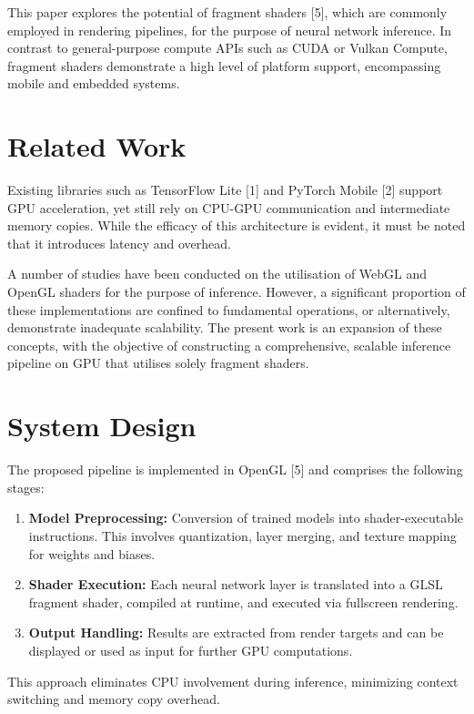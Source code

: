 \documentclass[conference]{IEEEtran}
\begin{document}
This paper explores the potential of fragment shaders [5], which are commonly employed in rendering pipelines, for the purpose of neural network inference. In contrast to general-purpose compute APIs such as CUDA or Vulkan Compute, fragment shaders demonstrate a high level of platform support, encompassing mobile and embedded systems.

\section{Related Work}
Existing libraries such as TensorFlow Lite [1] and PyTorch Mobile [2] support GPU acceleration, yet still rely on CPU-GPU communication and intermediate memory copies. While the efficacy of this architecture is evident, it must be noted that it introduces latency and overhead.

A number of studies have been conducted on the utilisation of WebGL and OpenGL shaders for the purpose of inference. However, a significant proportion of these implementations are confined to fundamental operations, or alternatively, demonstrate inadequate scalability. The present work is an expansion of these concepts, with the objective of constructing a comprehensive, scalable inference pipeline on GPU that utilises solely fragment shaders.

\section{System Design}
The proposed pipeline is implemented in OpenGL [5] and comprises the following stages:

\begin{enumerate}
    \item \textbf{Model Preprocessing:} Conversion of trained models into shader-executable instructions. This involves quantization, layer merging, and texture mapping for weights and biases.
    \item \textbf{Shader Execution:} Each neural network layer is translated into a GLSL fragment shader, compiled at runtime, and executed via fullscreen rendering.
    \item \textbf{Output Handling:} Results are extracted from render targets and can be displayed or used as input for further GPU computations.
\end{enumerate}

This approach eliminates CPU involvement during inference, minimizing context switching and memory copy overhead.
\end{document}
